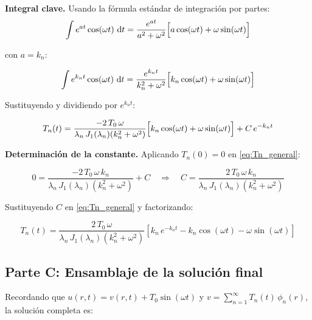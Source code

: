 \documentclass[12pt, a4paper]{article}
\newenvironment{resultado}[1][]{%
  \begin{tcolorbox}[resultadoestilo, title={#1}]%
}{%
  \end{tcolorbox}%
}
\newcommand{\dd}{\,\mathrm{d}}
\begin{document}
\medskip
\noindent\textbf{Integral clave.} Usando la fórmula estándar de integración por partes:
\begin{equation}
  \int e^{at}\cos(\omega t)\,\dd t
  = \frac{e^{at}}{a^2 + \omega^2}\Bigl[a\cos(\omega t) + \omega\sin(\omega t)\Bigr]
\end{equation}

con $a = k_n$:

\begin{equation}
  \int e^{k_n t}\cos(\omega t)\,\dd t
  = \frac{e^{k_n t}}{k_n^2 + \omega^2}
    \Bigl[k_n\cos(\omega t) + \omega\sin(\omega t)\Bigr]
\end{equation}

Sustituyendo y dividiendo por $e^{k_n t}$:

\begin{equation}
  T_n(t) = \frac{-2\,T_0\,\omega}{\lambda_n\,J_1(\lambda_n)(k_n^2 + \omega^2)}
  \Bigl[k_n\cos(\omega t) + \omega\sin(\omega t)\Bigr]
  + C\,e^{-k_n t}
  \label{eq:Tn_general}
\end{equation}

\medskip
\noindent\textbf{Determinación de la constante.} Aplicando $T_n(0) = 0$ en \eqref{eq:Tn_general}:

\begin{equation}
  0 = \frac{-2\,T_0\,\omega\,k_n}{\lambda_n\,J_1(\lambda_n)(k_n^2 + \omega^2)} + C
  \quad\Rightarrow\quad
  C = \frac{2\,T_0\,\omega\,k_n}{\lambda_n\,J_1(\lambda_n)(k_n^2 + \omega^2)}
\end{equation}

\medskip
\noindent Sustituyendo $C$ en \eqref{eq:Tn_general} y factorizando:

\begin{resultado}[Coeficiente temporal $T_n(t)$]
\begin{equation}
  T_n(t) = \frac{2\,T_0\,\omega}{\lambda_n\,J_1(\lambda_n)(k_n^2 + \omega^2)}
  \left[k_n\,e^{-k_n t} - k_n\cos(\omega t) - \omega\sin(\omega t)\right]
  \label{eq:Tn_final}
\end{equation}
\end{resultado}

\subsection{Parte C: Ensamblaje de la solución final}

Recordando que $u(r,t) = v(r,t) + T_0\sin(\omega t)$ y $v = \sum_{n=1}^{\infty} T_n(t)\,\phi_n(r)$,
la solución completa es:
\end{document}
